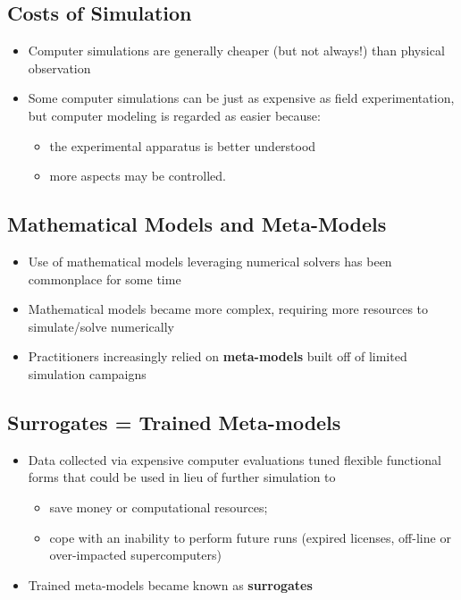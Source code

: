\documentclass[
  letterpaper,
  DIV=11,
  numbers=noendperiod]{scrreprt}
\providecommand{\tightlist}{%
  \setlength{\itemsep}{0pt}\setlength{\parskip}{0pt}}\usepackage{longtable,booktabs,array}
\begin{document}
\hypertarget{costs-of-simulation}{%
\subsection{Costs of Simulation}\label{costs-of-simulation}}

\begin{itemize}
\tightlist
\item
  Computer simulations are generally cheaper (but not always!) than
  physical observation
\item
  Some computer simulations can be just as expensive as field
  experimentation, but computer modeling is regarded as easier because:

  \begin{itemize}
  \tightlist
  \item
    the experimental apparatus is better understood
  \item
    more aspects may be controlled.
  \end{itemize}
\end{itemize}

\hypertarget{mathematical-models-and-meta-models}{%
\subsection{Mathematical Models and
Meta-Models}\label{mathematical-models-and-meta-models}}

\begin{itemize}
\tightlist
\item
  Use of mathematical models leveraging numerical solvers has been
  commonplace for some time
\item
  Mathematical models became more complex, requiring more resources to
  simulate/solve numerically
\item
  Practitioners increasingly relied on \textbf{meta-models} built off of
  limited simulation campaigns
\end{itemize}

\hypertarget{surrogates-trained-meta-models}{%
\subsection{Surrogates = Trained
Meta-models}\label{surrogates-trained-meta-models}}

\begin{itemize}
\tightlist
\item
  Data collected via expensive computer evaluations tuned flexible
  functional forms that could be used in lieu of further simulation to

  \begin{itemize}
  \tightlist
  \item
    save money or computational resources;
  \item
    cope with an inability to perform future runs (expired licenses,
    off-line or over-impacted supercomputers)
  \end{itemize}
\item
  Trained meta-models became known as \textbf{surrogates}
\end{itemize}
\end{document}
